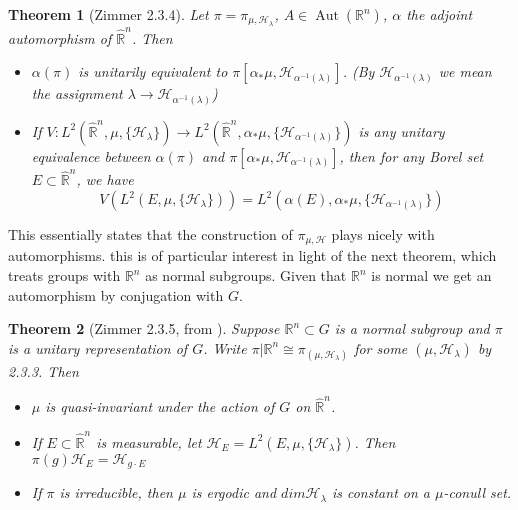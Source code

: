 \documentclass[
  12pt
]{article}
\theoremstyle{break}
\newtheorem{thm}{Theorem}[section]
\theoremstyle{plain}
\newcommand{\G}{\ensuremath{G}\xspace}
\newcommand{\bbr}{\ensuremath{\mathbb{R}}\xspace}
\newcommand{\hilb}{\ensuremath{\mathscr{H}}\xspace}
\DeclareMathOperator{\Aut}{Aut}
\begin{document}
  \begin{thm}[Zimmer 2.3.4]
    \label{thm:2.3.4}
    Let $\pi = \pi_{\mu, \hilb_{\lambda}}$, $A\in  \Aut(\bbr^n)$, $\alpha$ the
    adjoint automorphism of $\hat{\bbr}^n$. Then
    \begin{itemize}
      \item $\alpha(\pi)$ is unitarily equivalent to $\pi[\alpha_*\mu, \hilb_{\alpha^{-1}(\lambda)}]$. (By $\hilb_{\alpha^{-1}(\lambda)}$ we mean the assignment $\lambda \rightarrow \hilb_{\alpha^{-1}(\lambda)}$)
      \item If $V:L^2(\hat{\bbr}^n, \mu, \{\hilb_{\lambda}\}) \rightarrow L^2(\hat{\bbr}^n, \alpha_*\mu, \{\hilb_{\alpha^{-1}(\lambda)}\})$ is any unitary equivalence between $\alpha(\pi)$ and $\pi[\alpha_*\mu, \hilb_{\alpha^{-1}(\lambda)}]$, then for any Borel set $E \subset \hat{\bbr}^n$, we have
        $$
        V(L^2(E, \mu, \{\hilb_{\lambda}\})) = L^2(\alpha(E), \alpha_*\mu, \{\hilb_{\alpha^{-1}(\lambda)}\})
        $$
    \end{itemize}
  \end{thm}

  This essentially states that the construction of $\pi_{\mu, \hilb}$ plays
  nicely with automorphisms. this is of particular interest in light of the
  next theorem, which treats groups with $\bbr^n$ as normal subgroups. Given
  that $\bbr^n$ is normal we get an automorphism by conjugation with \G.

  \begin{thm}[Zimmer 2.3.5, from  \cite{mackey76}]
    \label{thm:2.3.5}
    Suppose $\mathbb{R}^n \subset G$ is a normal subgroup and $\pi$ is a unitary representation of $G$.
    Write $\pi | \mathbb{R}^n \cong \pi_{(\mu, \mathscr{H}_{\lambda})}$ for some
    $(\mu, \mathscr{H}_{\lambda})$ by 2.3.3. Then  
    \begin{itemize}
      \item $\mu$ is quasi-invariant under the action of $G$ on $\hat{\mathbb{R}}^n$. 
      \item If $E \subset \hat{\mathbb{R}}^n$ is measurable, let
        $\mathscr{H}_E = L^2(E, \mu, \{\mathscr{H}_{\lambda}\})$.
        Then $\pi(g)\mathscr{H}_E = \mathscr{H}_{g \cdot E}$
      \item If $\pi$ is irreducible, then $\mu$ is ergodic and $dim\mathscr{H}_{\lambda}$ is
        constant on a $\mu$-conull set.
    \end{itemize}
  \end{thm}
\end{document}
